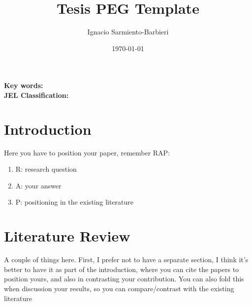 \documentclass[12pt,a4paper,onecolumn]{article}
\title{Tesis PEG Template }
\author{Ignacio Sarmiento-Barbieri }
\date{\today}
\begin{document}
\maketitle

\thispagestyle{empty} %





\begin{abstract}
\noindent %

\end{abstract}




\medskip

\begin{flushleft}
	{\bf Key words: } 				\\
	{\bf JEL Classification: }
\end{flushleft}

\pagebreak
\doublespacing





\section{Introduction} \label{sec:intro}

Here you have to position your paper, remember RAP:
\begin{enumerate}
    \item R: research question
    \item A: your answer
    \item P: positioning in the existing literature
\end{enumerate}

\section{Literature Review}

A couple of things here. First, I prefer not to have a separate section, I think it's better to have it as part of the introduction, where you can cite the papers to position yours, and also in contrasting your contribution. You can also fold this when discussion your results, so you can compare/contrast with the existing literature
\end{document}
